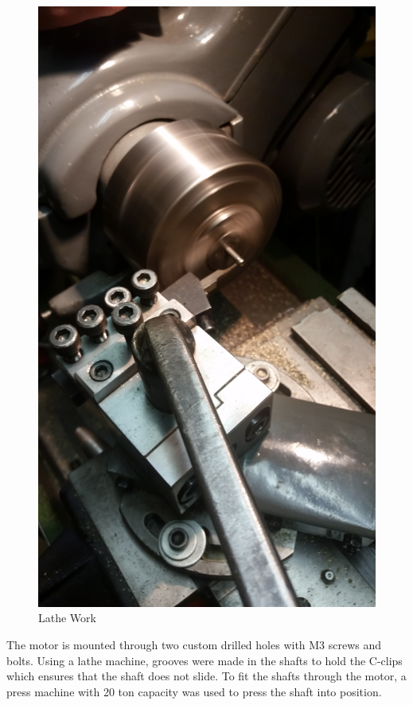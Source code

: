 \begin{figure}[H]
\begin{minipage}[b]{0.35\textwidth}
            \includegraphics[width = \textwidth, angle= 270]{VAPIQ-PICTURES/latheWork}
            \caption{Lathe Work}
        \end{minipage}
\end{figure}
\noindent
The motor is mounted through two custom drilled holes with M3 screws and bolts. Using a lathe machine, grooves were made in the shafts to hold the C-clips which ensures that the shaft does not slide. To fit the shafts through the motor, a press machine with 20 ton capacity was used to press the shaft into position. 

